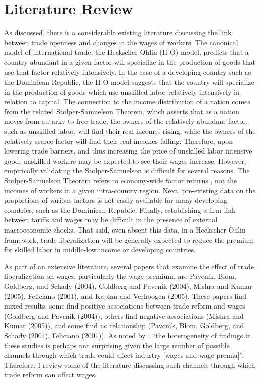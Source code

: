 \documentclass[12pt]{article}
\begin{document}
\section{Literature Review}
\label{sec:Litreview}
As discussed, there is a considerable existing literature discussing the link between trade openness
and changes in the wages of workers.
The canonical model of international trade, the Heckscher-Ohlin (H-O) model, 
predicts that a country abundant in a given factor will specialize 
in the production of goods that use that factor relatively intensively.
In the case of a developing country such as the Dominican Republic, the 
H-O model suggests that the country will specialize in the production of goods
which use unskilled labor relatively intensively in relation to capital. 
The connection to the income distribution of a nation comes from the related Stolper-Samuelson Theorem,
which asserts that as a nation moves from autarky to free trade, the owners of the relatively
abundant factor, such as unskilled labor, will find their real incomes rising, while the owners of
the relatively scarce factor will find their real incomes falling. 
Therefore, upon lowering trade barriers, and thus increasing the price of unskilled labor intensive
good, unskilled workers may be expected to see their wages
increase. However, empirically validating the Stolper-Samuelson is difficult for several reasons. 
The Stolper-Samuelson Theorem refers to economy-wide factor returns \citep{goldberg}, not the 
incomes of workers in a  given intra-country region. Next, pre-existing data on the  proportions
of various factors is not easily available for many developing countries, such as the Dominican Republic.
Finally, establishing a firm link between tariffs and wages may be difficult in the presence of external
macroeconomic shocks. That said, even absent this data, in a Heckscher-Ohlin framework, trade 
liberalization will be generally expected to reduce the premium for skilled labor in middle-low 
income or developing countries. 

As part of an extensive literature, several papers that examine the effect of trade liberalization on 
wages, particularly the wage premium, are Pavcnik, Blom, Goldberg, and Schady (2004), Goldberg
and Pavcnik (2004), Mishra and Kumar (2005), Feliciano (2001), and Kaplan and Verhoogen (2005).
These papers find mixed results, some find positive associations between trade reform and wages 
(Goldberg and Pavcnik (2004)), others find negative associations (Mishra and Kumar (2005)), and some 
find no relationship (Pavcnik, Blom, Goldberg, and Schady (2004), Feliciano (2001)). As noted by 
\citet{goldberg}, ``the heterogeneity of findings in these studies is perhaps not surprising 
given the large number of possible channels through which trade could affect industry [wages 
and wage premia]''. Therefore, I review some of the literature discussing such channels through
which trade reform can affect wages.
\end{document}
